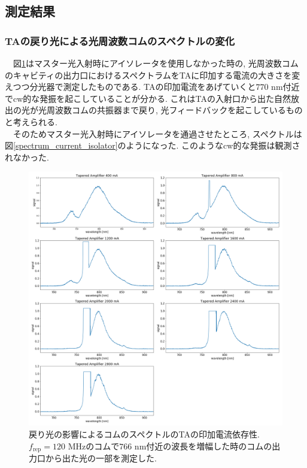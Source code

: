 \documentclass[uplatex, dvipdfmx, a4paper, report, papersize, 11pt]{jsbook}
\begin{document}
\subsection{測定結果}
\subsubsection{TAの戻り光による光周波数コムのスペクトルの変化}
　図\ref{spectrum_current_MODORI}はマスター光入射時にアイソレータを使用しなかった時の, 光周波数コムのキャビティの出力口におけるスペクトラムをTAに印加する電流の大きさを変えつつ分光器で測定したものである. TAの印加電流をあげていくと$770$ nm付近でcw的な発振を起こしていることが分かる. これはTAの入射口から出た自然放出の光が光周波数コムの共振器まで戻り, 光フィードバックを起こしているものと考えられる. \\
　そのためマスター光入射時にアイソレータを通過させたところ, スペクトルは図\ref{spectrum_current_isolator}のようになった. このようなcw的な発振は観測されなかった.
\begin{figure}[H]
 \begin{center}
  \includegraphics[width=140mm]{figures/chapter4/spectrum_current_MODORI.png}
\end{center}
 \caption{戻り光の影響によるコムのスペクトルのTAの印加電流依存性. $f_{\mathrm{rep}} = 120$ MHzのコムで$766$ nm付近の波長を増幅した時のコムの出力口から出た光の一部を測定した. }
 \label{spectrum_current_MODORI}
\end{figure}
\end{document}

